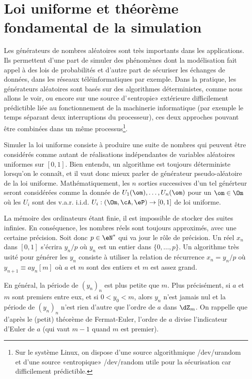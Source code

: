 %
\section{Loi uniforme et théorème fondamental de la simulation}
%

Les générateurs de nombres aléatoires sont très importants dans les
applications. Ils permettent d'une part de simuler des phénomènes dont la
modélisation fait appel à des lois de probabilités et d'autre part de
sécuriser les échanges de données, dans les réseaux téléinformatiques par
exemple. Dans la pratique, les générateurs aléatoires sont basés sur des
algorithmes déterministes, comme nous allons le voir, ou encore sur une source
d'«entropie» extérieure difficilement prédictible liée au fonctionnement de la
machinerie informatique (par exemple le temps séparant deux interruptions du
processeur), ces deux approches pouvant être combinées dans un même
processus\footnote{Sur le système Linux, on dispose d'une source algorithmique
  \textsf{/dev/urandom} et d'une source «entropique» \textsf{/dev/random}
  utile pour la sécurisation car difficilement prédictible.}.

Simuler la loi uniforme consiste à produire une suite de nombres qui peuvent
être considérés comme autant de réalisations indépendantes de variables
aléatoires uniformes sur $[0,1]$. Bien entendu, un algorithme est toujours
déterministe lorsqu'on le connaît, et il vaut donc mieux parler de générateur
pseudo-aléatoire de la loi uniforme. Mathématiquement, les $n$ sorties
successives d'un tel générteur seront considérées comme la donnée de
$U_1(\om),\dots,U_n(\om)$ pour un $\om\in\Om$ où les $U_i$ sont des v.a.r.
i.i.d. $U_i:(\Om,\cA,\eP)\to[0,1]$ de loi uniforme.

La mémoire des ordinateurs étant finie, il est impossible de stocker des
suites infinies. En conséquence, les nombres réels sont toujours approximés,
avec une certaine précision. Soit donc $p\in\eN^*$ qui va jour le rôle de
précision. Un réel $x_n$ dans $[0,1]$ s'écrira $y_n/p$ où $y_n$ est un entier
dans $\{0,\ldots,p\}$. Un algorithme très usité pour générer les $y_n$
consiste à utiliser la relation de récurrence $x_n=y_n/p$ où $y_{n+1}\equiv a
y_n [m]$ où $a$ et $m$ sont des entiers et $m$ est assez grand.

En général, la période de $(y_n)_n$ est plus petite que $m$. Plus précisément,
si $a$ et $m$ sont premiers entre eux, et si $0<y_0<m$, alors $y_n$ n'est
jamais nul et la période de $(y_n)_n$ n'est rien d'autre que l'ordre de $a$
dans $\dZ_m$. On rappelle que d'après le (petit) théorème de Fermat-Euler,
l'ordre de $a$ divise l'indicateur d'Euler de $a$ (qui vaut $m-1$ quand $m$
est premier).

